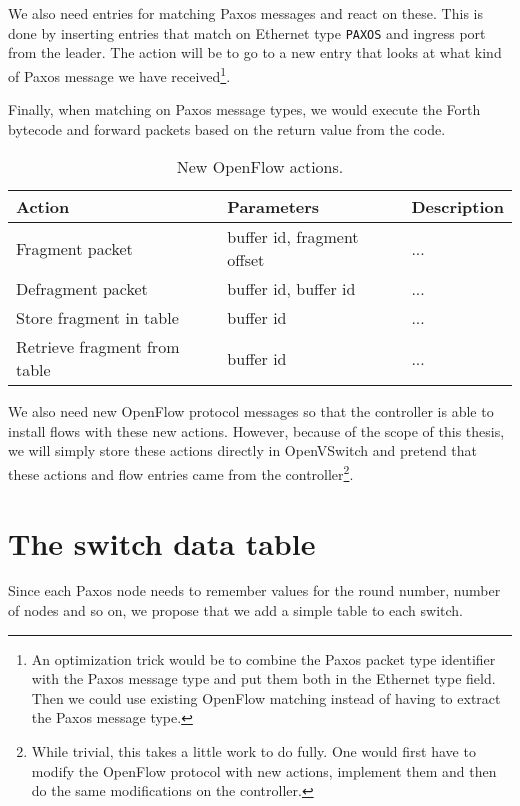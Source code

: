 We also need entries for matching Paxos messages and react on these.
This is done by inserting entries that match on Ethernet type
\texttt{PAXOS} and ingress port from the leader.
The action will be to go to a new entry that looks at what kind of Paxos
message we have received\footnote{An optimization trick would be to
combine the Paxos packet type identifier with the Paxos message type and put
them both in the Ethernet type field.  Then we could use existing OpenFlow
matching instead of having to extract the Paxos message type.}.

Finally, when matching on Paxos message types, we would execute the Forth
bytecode and forward packets based on the return value from the code.

\begin{table}[H]
  \centering
  \begin{tabular}{|l|l|l|}
    \hline \textbf{Action} & \textbf{Parameters} & \textbf{Description} \\
    \hline Fragment packet & buffer id, fragment offset & ... \\
    \hline Defragment packet & buffer id, buffer id & ... \\
    \hline Store fragment in table & buffer id & ... \\
    \hline Retrieve fragment from table & buffer id & ... \\
    \hline
  \end{tabular}

  \caption{New OpenFlow actions.}
  \label{table:openflow.new.actions}
\end{table}

We also need new OpenFlow protocol messages so that the controller is able
to install flows with these new actions.  However, because of the scope of
this thesis, we will simply store these actions directly in OpenVSwitch and
pretend that these actions and flow entries came from the
controller\footnote{While trivial, this takes a little work to do fully.
One would first have to modify the OpenFlow protocol with new actions,
implement them and then do the same modifications on the controller.}.

\section{The switch data table}

Since each Paxos node needs to remember values for the round number, number
of nodes and so on, we propose that we add a simple table to each switch.

